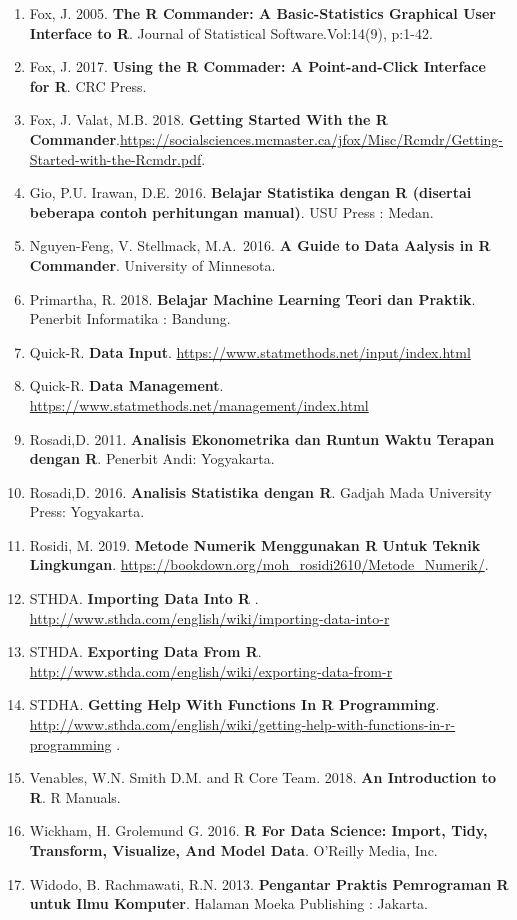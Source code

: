 \documentclass[12pt,]{krantz}
\providecommand{\tightlist}{%
  \setlength{\itemsep}{0pt}\setlength{\parskip}{0pt}}
\begin{document}
\begin{enumerate}
\def\labelenumi{\arabic{enumi}.}
\tightlist
\item
  Fox, J. 2005. \textbf{The R Commander: A Basic-Statistics Graphical User Interface to R}. Journal of Statistical Software.Vol:14(9), p:1-42.
\item
  Fox, J. 2017. \textbf{Using the R Commader: A Point-and-Click Interface for R}. CRC Press.
\item
  Fox, J. Valat, M.B. 2018. \textbf{Getting Started With the R Commander}.\url{https://socialsciences.mcmaster.ca/jfox/Misc/Rcmdr/Getting-Started-with-the-Rcmdr.pdf}.
\item
  Gio, P.U. Irawan, D.E. 2016. \textbf{Belajar Statistika dengan R (disertai beberapa contoh perhitungan manual)}. USU Press : Medan.
\item
  Nguyen-Feng, V. Stellmack, M.A.~2016. \textbf{A Guide to Data Aalysis in R Commander}. University of Minnesota.
\item
  Primartha, R. 2018. \textbf{Belajar Machine Learning Teori dan Praktik}. Penerbit Informatika : Bandung.
\item
  Quick-R. \textbf{Data Input}. \url{https://www.statmethods.net/input/index.html}
\item
  Quick-R. \textbf{Data Management}. \url{https://www.statmethods.net/management/index.html}
\item
  Rosadi,D. 2011. \textbf{Analisis Ekonometrika dan Runtun Waktu Terapan dengan R}. Penerbit Andi: Yogyakarta.
\item
  Rosadi,D. 2016. \textbf{Analisis Statistika dengan R}. Gadjah Mada University Press: Yogyakarta.
\item
  Rosidi, M. 2019. \textbf{Metode Numerik Menggunakan R Untuk Teknik Lingkungan}. \url{https://bookdown.org/moh_rosidi2610/Metode_Numerik/}.
\item
  STHDA. \textbf{Importing Data Into R }. \url{http://www.sthda.com/english/wiki/importing-data-into-r}
\item
  STHDA. \textbf{Exporting Data From R}. \url{http://www.sthda.com/english/wiki/exporting-data-from-r}
\item
  STDHA. \textbf{Getting Help With Functions In R Programming}. \url{http://www.sthda.com/english/wiki/getting-help-with-functions-in-r-programming} .
\item
  Venables, W.N. Smith D.M. and R Core Team. 2018. \textbf{An Introduction to R}. R Manuals.
\item
  Wickham, H. Grolemund G. 2016. \textbf{R For Data Science: Import, Tidy, Transform, Visualize, And Model Data}. O'Reilly Media, Inc.
\item
  Widodo, B. Rachmawati, R.N. 2013. \textbf{Pengantar Praktis Pemrograman R untuk Ilmu Komputer}. Halaman Moeka Publishing : Jakarta.
\end{enumerate}



\backmatter
\printindex
\end{document}
